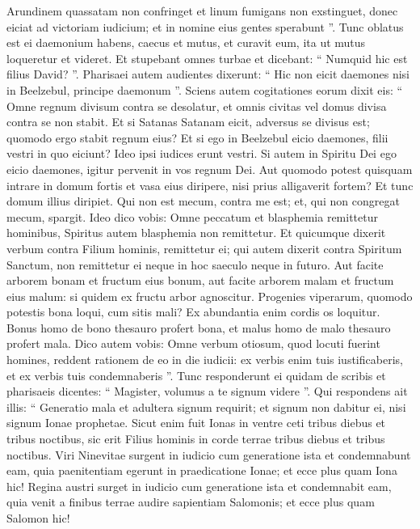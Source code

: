 \begin{biblechapter}
\begin{biblechapter}
\begin{biblechapter}
\begin{biblechapter}
\begin{biblechapter}
\begin{biblechapter}
\begin{biblechapter}
\begin{biblechapter}
\begin{biblechapter}
\begin{biblechapter}
\begin{biblechapter}
\begin{biblechapter}
 \verse Arundinem quassatam non confringet
 et linum fumigans non exstinguet,
 donec eiciat ad victoriam iudicium;
 \verse et in nomine eius gentes sperabunt ”.
 \verse Tunc oblatus est ei daemonium habens, caecus et mutus, et curavit eum, ita ut mutus loqueretur et videret. 
\verse Et stupebant omnes turbae et dicebant: “ Numquid hic est filius David? ”. 
\verse Pharisaei autem audientes dixerunt: “ Hic non eicit daemones nisi in Beelzebul, principe daemonum ”.
 \verse Sciens autem cogitationes eorum dixit eis: “ Omne regnum divisum contra se desolatur, et omnis civitas vel domus divisa contra se non stabit. 
\verse Et si Satanas Satanam eicit, adversus se divisus est; quomodo ergo stabit regnum eius? 
\verse Et si ego in Beelzebul eicio daemones, filii vestri in quo eiciunt? Ideo ipsi iudices erunt vestri. 
\verse Si autem in Spiritu Dei ego eicio daemones, igitur pervenit in vos regnum Dei. 
\verse Aut quomodo potest quisquam intrare in domum fortis et vasa eius diripere, nisi prius alligaverit fortem? Et tunc domum illius diripiet. 
\verse Qui non est mecum, contra me est; et, qui non congregat mecum, spargit.
 \verse Ideo dico vobis: Omne peccatum et blasphemia remittetur hominibus, Spiritus autem blasphemia non remittetur. 
\verse Et quicumque dixerit verbum contra Filium hominis, remittetur ei; qui autem dixerit contra Spiritum Sanctum, non remittetur ei neque in hoc saeculo neque in futuro.
 \verse Aut facite arborem bonam et fructum eius bonum, aut facite arborem malam et fructum eius malum: si quidem ex fructu arbor agnoscitur. 
\verse Progenies viperarum, quomodo potestis bona loqui, cum sitis mali? Ex abundantia enim cordis os loquitur. 
\verse Bonus homo de bono thesauro profert bona, et malus homo de malo thesauro profert mala. 
\verse Dico autem vobis: Omne verbum otiosum, quod locuti fuerint homines, reddent rationem de eo in die iudicii: 
 \verse ex verbis enim tuis iustificaberis, et ex verbis tuis condemnaberis ”.
 \verse Tunc responderunt ei quidam de scribis et pharisaeis dicentes: “ Magister, volumus a te signum videre ”. 
\verse Qui respondens ait illis: “ Generatio mala et adultera signum requirit; et signum non dabitur ei, nisi signum Ionae prophetae. 
\verse Sicut enim fuit Ionas in ventre ceti tribus diebus et tribus noctibus, sic erit Filius hominis in corde terrae tribus diebus et tribus noctibus. 
\verse Viri Ninevitae surgent in iudicio cum generatione ista et condemnabunt eam, quia paenitentiam egerunt in praedicatione Ionae; et ecce plus quam Iona hic! 
\verse Regina austri surget in iudicio cum generatione ista et condemnabit eam, quia venit a finibus terrae audire sapientiam Salomonis; et ecce plus quam Salomon hic!

\end{biblechapter}
\end{biblechapter}
\end{biblechapter}
\end{biblechapter}
\end{biblechapter}
\end{biblechapter}
\end{biblechapter}
\end{biblechapter}
\end{biblechapter}
\end{biblechapter}
\end{biblechapter}
\end{biblechapter}
